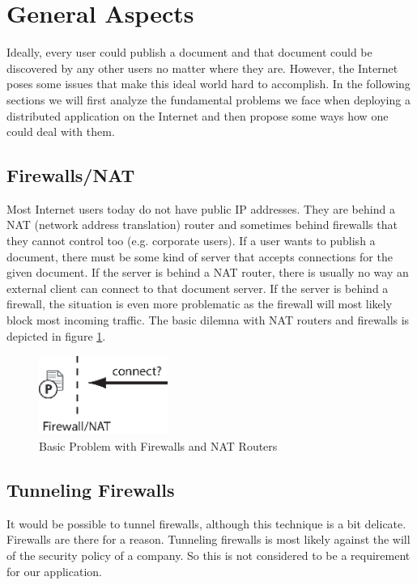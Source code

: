 \documentclass[11pt,a4paper]{article}
\begin{document}
\setlength{\parindent}{0pt}


\newpage

\tableofcontents
\newpage

\listoftables
\listoffigures
\newpage





\section{General Aspects}
Ideally, every user could publish a document and that document could be discovered by any other users no matter where they are. However, the Internet poses some issues that make this ideal world hard to accomplish. In the following sections we will first analyze the fundamental problems we face when deploying a distributed application on the Internet and then propose some ways how one could deal with them.

\subsection{Firewalls/NAT}
Most Internet users today do not have public IP addresses. They are behind a NAT (network address translation) router and sometimes behind firewalls that they cannot control too (e.g. corporate users). If a user wants to publish a document, there must be some kind of server that accepts connections for the given document. If the server is behind a NAT router, there is usually no way an external client can connect to that document server. If the server is behind a firewall, the situation is even more problematic as the firewall will most likely block most incoming traffic. The basic dilemna with NAT routers and firewalls is depicted in figure \ref{fig:firewall}.

\begin{figure}[H]
 \centering
 \includegraphics[width=4.2cm,height=2.6cm]{../../images/net_firewall.eps}
 \caption{Basic Problem with Firewalls and NAT Routers}
 \label{fig:firewall}
\end{figure}

\subsection{Tunneling Firewalls}
It would be possible to tunnel firewalls, although this technique is a bit delicate. Firewalls are there for a reason. Tunneling firewalls is most likely against the will of the security policy of a company. So this is not considered to be a requirement for our application.
\end{document}
